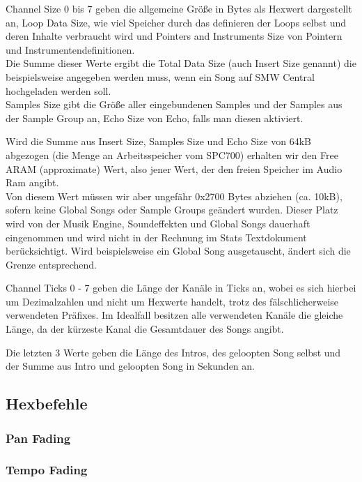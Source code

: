 Channel Size 0 bis 7 geben die allgemeine Größe in Bytes als Hexwert dargestellt an,
Loop Data Size, wie viel Speicher durch das definieren der Loops selbst und deren Inhalte verbraucht wird und Pointers and Instruments Size von Pointern und Instrumentendefinitionen. \\
Die Summe dieser Werte ergibt die Total Data Size (auch Insert Size genannt) die beispielsweise angegeben werden muss, wenn ein Song auf SMW Central hochgeladen werden soll. \\
Samples Size gibt die Größe aller eingebundenen Samples und der Samples aus der Sample Group an, Echo Size von Echo, falls man diesen aktiviert.

\bigskip

Wird die Summe aus Insert Size, Samples Size und Echo Size von 64kB abgezogen (die Menge an Arbeitsspeicher vom SPC700) erhalten wir den Free ARAM (approximate) Wert, also jener Wert, der den freien Speicher im Audio Ram angibt. \\
Von diesem Wert müssen wir aber ungefähr 0x2700 Bytes abziehen (ca. 10kB), sofern keine Global Songs oder Sample Groups geändert wurden. Dieser Platz wird von der Musik Engine, Soundeffekten und Global Songs dauerhaft eingenommen und wird nicht in der Rechnung im Stats Textdokument berücksichtigt. Wird beispielsweise ein Global Song ausgetauscht, ändert sich die Grenze entsprechend.

\bigskip

Channel Ticks 0 - 7 geben die Länge der Kanäle in Ticks an, wobei es sich hierbei um Dezimalzahlen und nicht um Hexwerte handelt, trotz des fälschlicherweise verwendeten Präfixes. Im Idealfall besitzen alle verwendeten Kanäle die gleiche Länge, da der kürzeste Kanal die Gesamtdauer des Songs angibt.

\bigskip

Die letzten 3 Werte geben die Länge des Intros, des geloopten Song selbst und der Summe aus Intro und geloopten Song in Sekunden an.

\subsection{Hexbefehle}
\subsubsection{Pan Fading}
\subsubsection{Tempo Fading}
